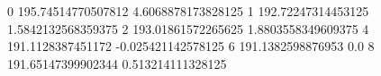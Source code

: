 0 195.74514770507812 4.6068878173828125
1 192.72247314453125 1.5842132568359375
2 193.01861572265625 1.8803558349609375
4 191.1128387451172 -0.025421142578125
6 191.1382598876953 0.0
8 191.65147399902344 0.513214111328125
